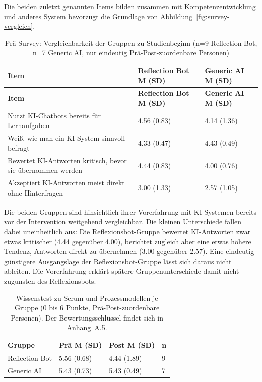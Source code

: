 Die beiden zuletzt genannten Items bilden zusammen mit \glqq Kompetenzentwicklung\grqq{} und
\glqq anderes System bevorzugt\grqq{} die Grundlage von Abbildung~\ref{fig:survey-vergleich}.

\begingroup
\small
\setlength{\tabcolsep}{6pt}
\begin{longtable}{p{7.5cm} p{2.7cm} p{2.7cm}}
    \caption{Prä-Survey: Vergleichbarkeit der Gruppen zu Studienbeginn (n=9 Reflection Bot, n=7 Generic AI, nur eindeutig Prä-Post-zuordenbare Personen)}
    \label{tab:survey-praeexperience} \\
    \toprule
    \textbf{Item} & \textbf{Reflection Bot M (SD)} & \textbf{Generic AI M (SD)} \\
    \midrule
    \endfirsthead
    \toprule
    \textbf{Item} & \textbf{Reflection Bot M (SD)} & \textbf{Generic AI M (SD)} \\
    \midrule
    \endhead
    \bottomrule
    \endfoot
    Nutzt KI-Chatbots bereits für Lernaufgaben & 4.56 (0.83) & 4.14 (1.36) \\
    Weiß, wie man ein KI-System sinnvoll befragt & 4.33 (0.47) & 4.43 (0.49) \\
    Bewertet KI-Antworten kritisch, bevor sie übernommen werden & 4.44 (0.83) & 4.00 (0.76) \\
    Akzeptiert KI-Antworten meist direkt ohne Hinterfragen & 3.00 (1.33) & 2.57 (1.05) \\
\end{longtable}
\endgroup

Die beiden Gruppen sind hinsichtlich ihrer Vorerfahrung mit KI-Systemen bereits vor der Intervention
weitgehend vergleichbar. Die kleinen Unterschiede fallen dabei uneinheitlich aus: Die
Reflexionsbot-Gruppe bewertet KI-Antworten zwar etwas kritischer (4.44 gegenüber 4.00), berichtet
zugleich aber eine etwas höhere Tendenz, Antworten direkt zu übernehmen (3.00 gegenüber 2.57). Eine
eindeutig günstigere Ausgangslage der Reflexionsbot-Gruppe lässt sich daraus nicht ableiten. Die
Vorerfahrung erklärt spätere Gruppenunterschiede damit nicht zugunsten des Reflexionsbots.

\begin{table}[htbp]
    \centering
    \caption[Wissenstest zu Scrum und Prozessmodellen je Gruppe]{Wissenstest zu Scrum und
    Prozessmodellen je Gruppe (0 bis 6 Punkte, Prä-Post-zuordenbare Personen). Der
    Bewertungsschlüssel findet sich in \hyperref[app:fragebogen]{Anhang~A.5}.}
    \label{tab:survey-wissenstest}
    \begin{tabular}{p{3.5cm} p{2.8cm} p{2.8cm} p{1.2cm}}
        \toprule
        \textbf{Gruppe} & \textbf{Prä M (SD)} & \textbf{Post M (SD)} & \textbf{n} \\
        \midrule
        Reflection Bot & 5.56 (0.68) & 4.44 (1.89) & 9 \\
        Generic AI & 5.43 (0.73) & 5.43 (0.49) & 7 \\
        \bottomrule
    \end{tabular}
\end{table}

